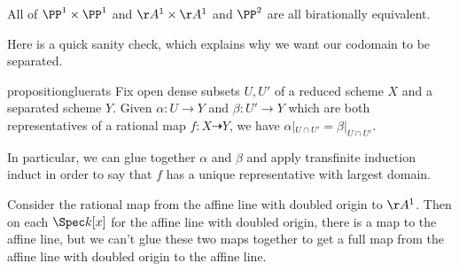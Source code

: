 \documentclass[../notes.tex]{subfiles}
\begin{document}
\begin{example}
	All of $\PP^1\times\PP^1$ and $\AA^1\times\AA^1$ and $\PP^2$ are all birationally equivalent.
\end{example}
Here is a quick sanity check, which explains why we want our codomain to be separated.
\begin{restatable}{proposition}{gluerats} \label{prop:glue-rats}
	Fix open dense subsets $U,U'$ of a reduced scheme $X$ and a separated scheme $Y$. Given $\alpha\colon U\to Y$ and $\beta\colon U'\to Y$ which are both representatives of a rational map $f\colon X\dashrightarrow Y$, we have $\alpha|_{U\cap U'}=\beta|_{U\cap U'}$.
\end{restatable}
\noindent In particular, we can glue together $\alpha$ and $\beta$ and apply transfinite induction induct in order to say that $f$ has a unique representative with largest domain.
\begin{nex}
	Consider the rational map from the affine line with doubled origin to $\AA^1$. Then on each $\Spec k[x]$ for the affine line with doubled origin, there is a map to the affine line, but we can't glue these two maps together to get a full map from the affine line with doubled origin to the affine line.
\end{nex}
\end{document}

